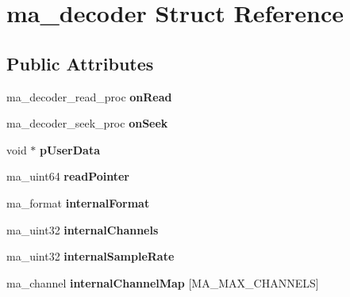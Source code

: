 \hypertarget{structma__decoder}{}\section{ma\+\_\+decoder Struct Reference}
\label{structma__decoder}
\subsection*{Public Attributes}
\begin{DoxyCompactItemize}
\item 
\mbox{\label{structma__decoder_ad14a7f9e20dfd46e238f96d51d46f18f}} 
ma\+\_\+decoder\+\_\+read\+\_\+proc {\bfseries on\+Read}
\item 
\mbox{\label{structma__decoder_ae6cd5588325e161775a5456ff66cf302}} 
ma\+\_\+decoder\+\_\+seek\+\_\+proc {\bfseries on\+Seek}
\item 
\mbox{\label{structma__decoder_ade170d8580cf3f2ce9b1fa00076fd183}} 
void $\ast$ {\bfseries p\+User\+Data}
\item 
\mbox{\label{structma__decoder_ae759dd3df6434fbce1f825f1d1d0645b}} 
ma\+\_\+uint64 {\bfseries read\+Pointer}
\item 
\mbox{\label{structma__decoder_a5466df02457a80e3b953d0cb513d37b2}} 
ma\+\_\+format {\bfseries internal\+Format}
\item 
\mbox{\label{structma__decoder_a07cee2126f985e9327dd89c1e875c397}} 
ma\+\_\+uint32 {\bfseries internal\+Channels}
\item 
\mbox{\label{structma__decoder_aa60216630d76d02900cacb9f2032ec03}} 
ma\+\_\+uint32 {\bfseries internal\+Sample\+Rate}
\item 
\mbox{\label{structma__decoder_a17f74f19b961fcefbc681731c6e2225b}} 
ma\+\_\+channel {\bfseries internal\+Channel\+Map} \mbox{[}M\+A\+\_\+\+M\+A\+X\+\_\+\+C\+H\+A\+N\+N\+E\+LS\mbox{]}
\item 
\mbox{\label{structma__decoder_a99e75664cebea3a92fc07d2458fb4bbf}} 

\end{DoxyCompactItemize}
